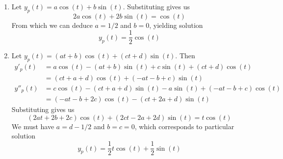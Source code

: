 \documentclass[a4paper]{article}
\begin{document}
\begin{enumerate}[label=(\alph*)]
	\item Let \( y_{p } \!\left( t  \right) = a \cos\!\left(t \right) + b \sin\!\left(t \right)  \). Substituting gives us
	\[
		2a \cos\!\left(t \right) + 2b \sin\!\left(t \right) = \cos\!\left(t \right)  
	\]
	From which we can deduce \( a = 1/2 \) and \( b = 0 \), yielding solution
	\[
		y_{p } \!\left( t  \right) = \frac{1}{2}\cos\!\left(t \right)  
	\]
	\item Let \( y_{p } \!\left( t  \right) = \!\left( at + b  \right)\cos\!\left(t \right) + \!\left( ct + d  \right) \sin\!\left(t \right)   \). Then
	\begin{align*}
		y'_{p} \!\left( t  \right) & = a \cos\!\left(t \right) - \!\left( at + b  \right) \sin\!\left(t \right) +c \sin\!\left(t \right) + \!\left( ct + d  \right) \cos\!\left(t \right) \\
					   & = \!\left( ct + a + d  \right) \cos\!\left(t \right) + \!\left( -at - b + c  \right) \sin\!\left(t \right) \\
		y''_{p } \!\left( t  \right) & = c \cos\!\left(t \right) - \!\left( ct + a + d  \right) \sin\!\left(t \right) - a \sin\!\left(t \right) + \!\left( -at - b + c  \right) \cos\!\left(t \right) \\
					     & = \!\left( -at - b + 2c \right) \cos\!\left(t \right) - \!\left( ct + 2a + d \right) \sin\!\left(t \right) 
	\end{align*}
	Substituting gives us
	\[
		 \!\left( 2at + 2b + 2c \right) \cos\!\left(t \right) + \!\left( 2ct - 2a + 2d \right) \sin\!\left(t \right) = t \cos\!\left(t \right) 
	\]
	We must have \( a = d - 1/2 \) and \( b = c = 0 \), which corresponds to particular solution
	\[
		y_{p } \!\left( t  \right) = \frac{1}{2}t \cos\!\left(t \right) + \frac{1}{2} \sin\!\left(t \right)  
	\]
\end{enumerate}

\end{document}
